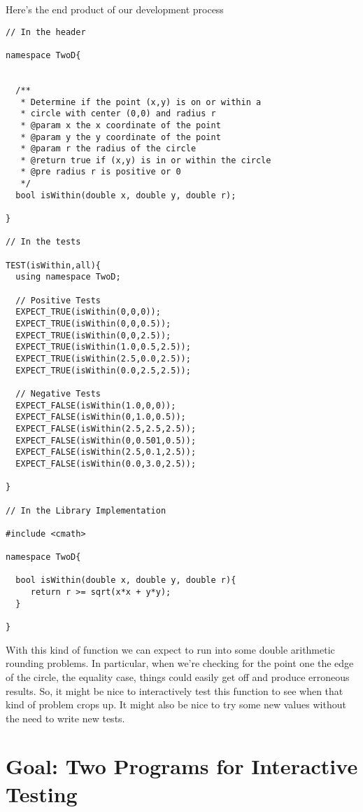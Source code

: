 \documentclass[]{tufte-handout}
\begin{document}
Here's the end product of our development process
\begin{verbatim}
// In the header

namespace TwoD{
  
  
  /**
   * Determine if the point (x,y) is on or within a 
   * circle with center (0,0) and radius r
   * @param x the x coordinate of the point
   * @param y the y coordinate of the point
   * @param r the radius of the circle
   * @return true if (x,y) is in or within the circle
   * @pre radius r is positive or 0
   */
  bool isWithin(double x, double y, double r);

}

// In the tests

TEST(isWithin,all){
  using namespace TwoD;
  
  // Positive Tests 
  EXPECT_TRUE(isWithin(0,0,0));
  EXPECT_TRUE(isWithin(0,0,0.5));
  EXPECT_TRUE(isWithin(0,0,2.5));
  EXPECT_TRUE(isWithin(1.0,0.5,2.5));   
  EXPECT_TRUE(isWithin(2.5,0.0,2.5));
  EXPECT_TRUE(isWithin(0.0,2.5,2.5));
	  
  // Negative Tests
  EXPECT_FALSE(isWithin(1.0,0,0));
  EXPECT_FALSE(isWithin(0,1.0,0.5));
  EXPECT_FALSE(isWithin(2.5,2.5,2.5));
  EXPECT_FALSE(isWithin(0,0.501,0.5));   
  EXPECT_FALSE(isWithin(2.5,0.1,2.5));
  EXPECT_FALSE(isWithin(0.0,3.0,2.5));
  
}

// In the Library Implementation

#include <cmath>

namespace TwoD{

  bool isWithin(double x, double y, double r){
     return r >= sqrt(x*x + y*y);
  }

}
\end{verbatim}

With this kind of function we can expect to run into some double arithmetic rounding problems. In particular, when we're checking for the point one the edge of the circle, the equality case, things could easily get off and produce erroneous results. So, it might be nice to interactively test this function to see when that kind of problem crops up. It might also be nice to try some new values without the need to write new tests. 


\section{Goal: Two Programs for Interactive Testing}
\end{document}
